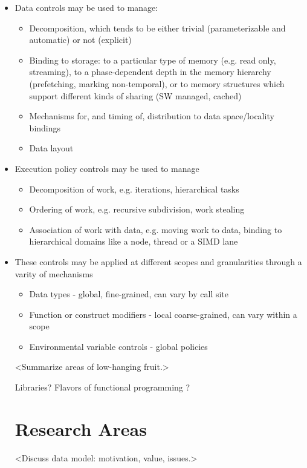     \begin{itemize}
    \item Data controls may be used to manage:
      \begin{itemize} 
      \item Decomposition, which tends to be either trivial (parameterizable and automatic) or not (explicit)
      \item Binding to storage: to a particular type of memory (e.g. read only, streaming), to a phase-dependent depth in the memory hierarchy (prefetching, marking non-temporal), or to memory structures which support different kinds of sharing (SW managed, cached)
      \item Mechanisms for, and timing of, distribution to data space/locality bindings
      \item Data layout
      \end{itemize}
    \item Execution policy controls may be used to manage
      \begin{itemize} 
      \item Decomposition of work, e.g. iterations, hierarchical tasks
      \item Ordering of work, e.g. recursive subdivision, work stealing
      \item Association of work with data, e.g. moving work to data, binding to hierarchical domains like a node, thread or a SIMD lane
      \end{itemize}
    \item These controls may be applied at different scopes and granularities through a varity of mechanisms
      \begin{itemize} 
      \item Data types - global, fine-grained, can vary by call site
      \item Function or construct modifiers - local coarse-grained, can vary within a scope
      \item Environmental variable controls - global policies
      \end{itemize}


<Summarize areas of low-hanging fruit.>

Libraries? 
Flavors of functional programming ?

\section{Research Areas}

<Discuss data model: motivation, value, issues.>


\end{itemize}

